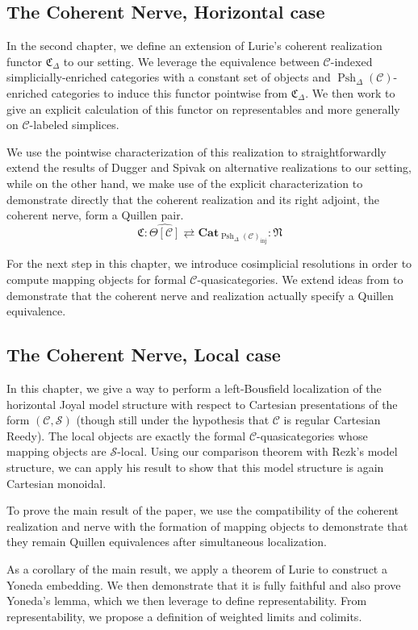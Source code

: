 \documentclass[leqno]{article}
\numberwithin{equation}{subsection}
\theoremstyle{plain}   %
\theoremstyle{remark}
\theoremstyle{plain}
\newcommand{\Cat}{\ensuremath{\mathbf{Cat}}}
\providecommand{\C}{}
\renewcommand{\C}{\ensuremath{\mathcal{C}}}
\newcommand{\setS}{\ensuremath{\mathscr{S}}}
\newcommand{\cellset}{\ensuremath{\widehat{\Theta[\mathcal{C}]}}}
\newcommand{\spsh}{\ensuremath{\operatorname{Psh}_\Delta(\mathcal{C})}}
\begin{document}
\subsection*{The Coherent Nerve, Horizontal case}
In the second chapter, we define an extension of Lurie's coherent realization functor \(\mathfrak{C}_\Delta\) to our setting.  We leverage the equivalence between \(\C\)-indexed simplicially-enriched categories with a constant set of objects and \(\spsh\)-enriched categories to induce this functor pointwise from \(\mathfrak{C}_\Delta\).  We then work to give an explicit calculation of this functor on representables and more generally on \(\C\)-labeled simplices.  

We use the pointwise characterization of this realization to straightforwardly extend the results of Dugger and Spivak \cite{ds1} on alternative realizations to our setting, while on the other hand, we make use of the explicit characterization to demonstrate directly that the coherent realization and its right adjoint, the coherent nerve, form a Quillen pair.
\[
	\mathfrak{C}:\cellset \rightleftarrows \Cat_{\spsh_{\mathrm{inj}}}:\mathfrak{N}
\]

For the next step in this chapter, we introduce cosimplicial resolutions in order to compute mapping objects for formal \(\C\)-quasicategories.  We extend ideas from \cite{ds2} to demonstrate that the coherent nerve and realization actually specify a Quillen equivalence.

\subsection*{The Coherent Nerve, Local case}
In this chapter, we give a way to perform a left-Bousfield localization of the horizontal Joyal model structure with respect to Cartesian presentations of the form \((\C,\setS)\) (though still under the hypothesis that \(\C\) is regular Cartesian Reedy).  The local objects are exactly the formal \(\C\)-quasicategories whose mapping objects are \(\setS\)-local.  Using our comparison theorem with Rezk's model structure, we can apply his result to show that this model structure is again Cartesian monoidal.  

To prove the main result of the paper, we use the compatibility of the coherent realization and nerve with the formation of mapping objects to demonstrate that they remain Quillen equivalences after simultaneous localization. 

As a corollary of the main result, we apply a theorem of Lurie to construct a Yoneda embedding.  We then demonstrate that it is fully faithful and also prove Yoneda's lemma, which we then leverage to define representability.  From representability, we propose a definition of weighted limits and colimits.  
\end{document}
